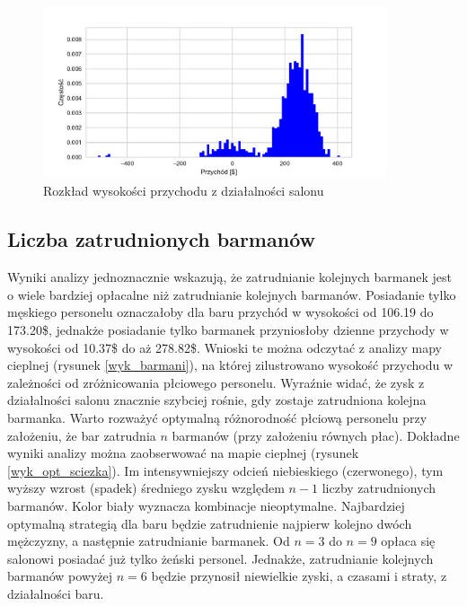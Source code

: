 \documentclass[12pt, a4paper, oneside]{mwart} %
\begin{document}
\begin{figure}
\centering
\caption{Rozkład wysokości przychodu z działalności salonu}
\label{wyk_przychod}
\includegraphics[width = 0.9\textwidth]{wykresy/histogram.pdf}
\end{figure}

\subsection{Liczba zatrudnionych barmanów}
Wyniki analizy jednoznacznie wskazują, że zatrudnianie kolejnych barmanek jest o wiele bardziej opłacalne niż zatrudnianie kolejnych barmanów. Posiadanie tylko męskiego personelu oznaczałoby dla baru przychód w wysokości od 106.19 do 173.20\$, jednakże posiadanie tylko barmanek przyniosłoby dzienne przychody w wysokości od 10.37\$ do aż 278.82\$. Wnioski te można odczytać z analizy mapy cieplnej (rysunek \ref{wyk_barmani}), na której zilustrowano wysokość przychodu w zależności od zróżnicowania płciowego personelu. Wyraźnie widać, że zysk z działalności salonu znacznie szybciej rośnie, gdy zostaje zatrudniona kolejna barmanka. Warto rozważyć optymalną różnorodność płciową personelu przy założeniu, że bar zatrudnia $n$ barmanów (przy założeniu równych płac). Dokładne wyniki analizy można zaobserwować na mapie cieplnej (rysunek \ref{wyk_opt_sciezka}). Im intensywniejszy odcień niebieskiego (czerwonego), tym wyższy wzrost (spadek) średniego zysku względem $n-1$ liczby zatrudnionych barmanów. Kolor biały wyznacza kombinacje nieoptymalne. Najbardziej optymalną strategią dla baru będzie zatrudnienie najpierw kolejno dwóch mężczyzny, a następnie zatrudnianie barmanek. Od $n =3$ do $n=9$ opłaca się salonowi posiadać już tylko żeński personel. Jednakże, zatrudnianie kolejnych barmanów powyżej $n=6$ będzie przynosił niewielkie zyski, a czasami i straty, z działalności baru. 
\end{document}
